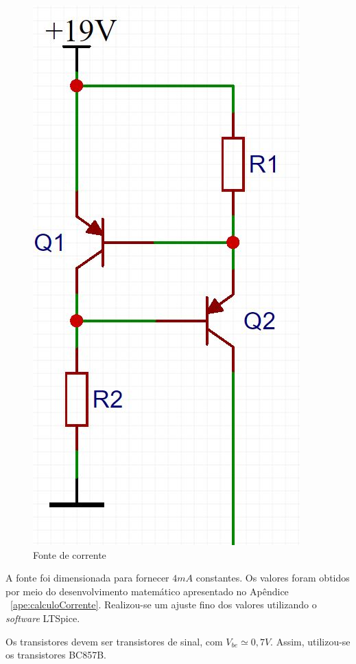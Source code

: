 \documentclass[
	12pt,				%
	openright,			%
	twoside,			%
	a4paper,			%
	english,			%
	french,				%
	spanish,			%
	brazil,				%
	]{abntex2}
\begin{document}
		\begin{figure}[!ht]
			\centering
			\includegraphics[scale = 0.3]{../Fotos/fonteCorrenteClean2.jpg}
			\caption{Fonte de corrente}
			\label{fig:topologiaFonteCorrente}
		\end{figure}

		A fonte foi dimensionada para fornecer $4mA$ constantes. Os valores foram obtidos por meio do desenvolvimento matemático apresentado no Apêndice ~\ref{ape:calculoCorrente}. Realizou-se um ajuste fino dos valores utilizando o \textit{software} LTSpice.

		Os transistores devem ser transistores de sinal, com
		$V_{be}\simeq 0,7V$. Assim, utilizou-se os transistores BC857B.
\end{document}
